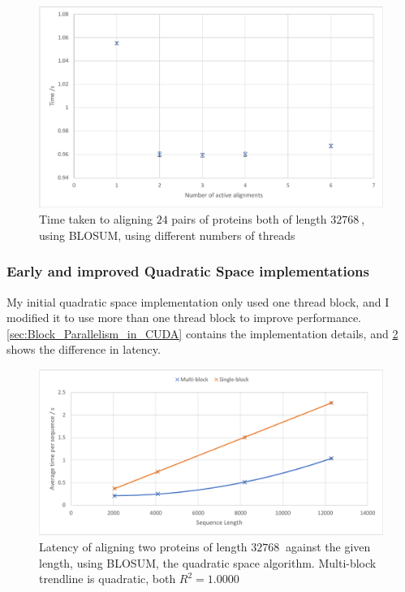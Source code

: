 \begin{figure}
    \centering
    \includegraphics[width=\textwidth]{figs/eval/cu_cores.pdf}
    \caption{Time taken to aligning $24$ pairs of proteins both of length $\SI{32768}{}$, using BLOSUM, using different numbers of threads}
    \label{fig:CU_Cores}
\end{figure}

\subsubsection{Early and improved Quadratic Space implementations}
\label{sec:CUDA_single_multi_block_eval}

My initial quadratic space implementation only used one thread block, and I modified it to use more than one thread block to improve performance.
\cref{sec:Block_Parallelism_in_CUDA} contains the implementation details, and \cref{fig:CU_Multiblock} shows the difference in latency.

\begin{figure}
    \centering
    \includegraphics[width=\textwidth]{figs/eval/cu_single_block.pdf}
    \caption{Latency of aligning two proteins of length $\SI{32768}{}$ against the given length, using BLOSUM, the quadratic space algorithm. Multi-block trendline is quadratic, both $R^2=1.0000$}
    \label{fig:CU_Multiblock}
\end{figure}


